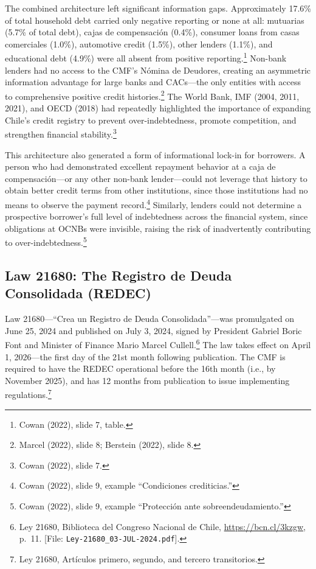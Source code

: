 \documentclass[12pt]{article}
\theoremstyle{plain}
\theoremstyle{plain}
\begin{document}
The combined architecture left significant information gaps. Approximately 17.6\% of total household debt carried only negative reporting or none at all: mutuarias (5.7\% of total debt), cajas de compensaci\'on (0.4\%), consumer loans from casas comerciales (1.0\%), automotive credit (1.5\%), other lenders (1.1\%), and educational debt (4.9\%) were all absent from positive reporting.\footnote{Cowan (2022), slide 7, table.} Non-bank lenders had no access to the CMF's N\'omina de Deudores, creating an asymmetric information advantage for large banks and CACs—the only entities with access to comprehensive positive credit histories.\footnote{Marcel (2022), slide 8; Berstein (2022), slide 8.} The World Bank, IMF (2004, 2011, 2021), and OECD (2018) had repeatedly highlighted the importance of expanding Chile's credit registry to prevent over-indebtedness, promote competition, and strengthen financial stability.\footnote{Cowan (2022), slide 7.}

This architecture also generated a form of informational lock-in for borrowers. A person who had demonstrated excellent repayment behavior at a caja de compensaci\'on—or any other non-bank lender—could not leverage that history to obtain better credit terms from other institutions, since those institutions had no means to observe the payment record.\footnote{Cowan (2022), slide 9, example ``Condiciones crediticias.''} Similarly, lenders could not determine a prospective borrower's full level of indebtedness across the financial system, since obligations at OCNBs were invisible, raising the risk of inadvertently contributing to over-indebtedness.\footnote{Cowan (2022), slide 9, example ``Protecci\'on ante sobreendeudamiento.''}

\subsection{Law 21680: The Registro de Deuda Consolidada (REDEC)}

Law 21680—``Crea un Registro de Deuda Consolidada''—was promulgated on June 25, 2024 and published on July 3, 2024, signed by President Gabriel Boric Font and Minister of Finance Mario Marcel Cullell.\footnote{Ley 21680, Biblioteca del Congreso Nacional de Chile, \url{https://bcn.cl/3kzgw}, p.\ 11. [File: \texttt{Ley-21680\_03-JUL-2024.pdf}].} The law takes effect on April 1, 2026—the first day of the 21st month following publication. The CMF is required to have the REDEC operational before the 16th month (i.e., by November 2025), and has 12 months from publication to issue implementing regulations.\footnote{Ley 21680, Art\'iculos primero, segundo, and tercero transitorios.}
\end{document}
